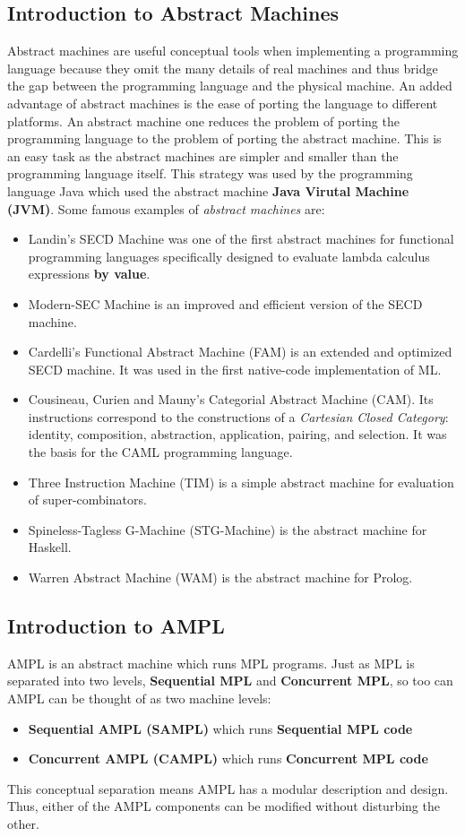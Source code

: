 \documentclass[11pt]{article}
\newcommand{\<}{\langle}
\renewcommand{\>}{\rangle}
\begin{document}
\subsection {Introduction to Abstract Machines}
Abstract machines are useful conceptual tools when implementing a programming language because they omit the many details of real machines and thus bridge the gap between the programming language and the physical machine. An added advantage of abstract machines is the ease of porting the language to different platforms. An abstract machine one reduces the problem of porting the programming language to the problem of porting the abstract machine. This is an easy task as the abstract machines are simpler and smaller than the programming language itself. This strategy was used by the programming language Java which used the abstract machine {\bf Java Virutal Machine (JVM)}. Some famous examples of {\em abstract machines} are:
\begin{itemize} 
  \item Landin's SECD Machine was one of the first abstract machines for functional programming languages specifically designed to evaluate lambda calculus expressions {\bf by value}.
  \item Modern-SEC Machine is an improved and efficient version of the SECD machine.
  \item Cardelli's Functional Abstract Machine (FAM) is an extended and optimized SECD machine. It was used in the first native-code implementation of ML.
  \item Cousineau, Curien and Mauny's Categorial Abstract Machine (CAM). Its instructions correspond to the constructions of a {\em Cartesian Closed Category}: identity, composition, abstraction, application, pairing, and selection. It was the basis for the CAML programming language.
  \item Three Instruction Machine (TIM) is a simple abstract machine for evaluation of super-combinators.
  \item Spineless-Tagless G-Machine (STG-Machine) is the abstract machine for Haskell.
  \item Warren Abstract Machine (WAM) is the abstract machine for Prolog.
\end {itemize}

\subsection {Introduction to AMPL}
AMPL is an abstract machine which runs MPL programs. Just as MPL is separated into two levels, {\bf Sequential MPL} and {\bf Concurrent MPL}, so too can AMPL can be thought of as two machine levels:
\begin{itemize}
  \item {\bf Sequential AMPL (SAMPL)} which runs {\bf Sequential MPL code}
  \item {\bf Concurrent AMPL (CAMPL)} which runs {\bf Concurrent MPL code}
\end {itemize}
This conceptual separation means AMPL has a modular description and design. Thus, either of the AMPL components can be modified without disturbing the other.
\end{document}

